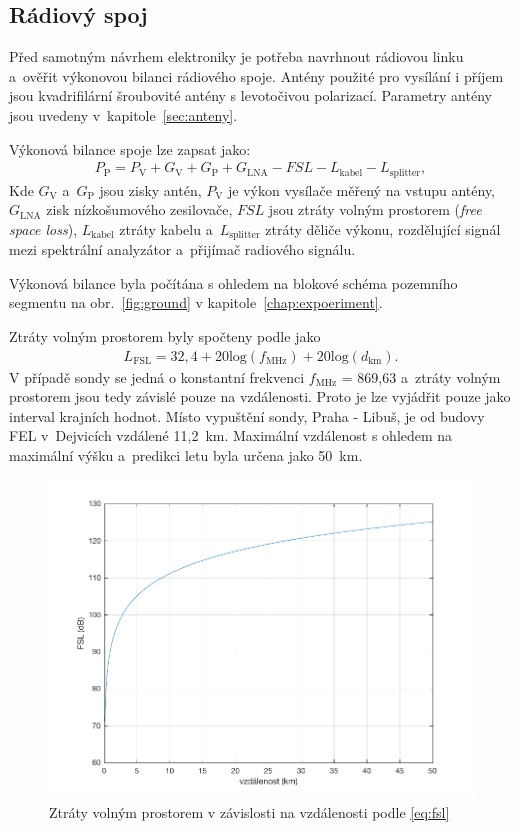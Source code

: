 \documentclass[twoside]{ctuthesis}
\newcommand{\mt}[1]{\text{#1}}
\theoremstyle{plain}
\theoremstyle{definition}
\theoremstyle{note}
\begin{document}
		\subsection{Rádiový spoj}
		Před samotným návrhem elektroniky je potřeba navrhnout rádiovou linku a~ověřit výkonovou bilanci rádiového spoje. Antény použité pro vysílání i příjem jsou kvadrifilární šroubovité antény s levotočivou polarizací. Parametry antény jsou uvedeny v~kapitole~\ref{sec:anteny}.

		Výkonová bilance spoje lze zapsat jako:
		\begin{align}
			P_\mt{P} = P_\mt{V} + G_\mt{V} + G_\mt{P} + G_\mt{LNA} - FSL - L_\mt{kabel} - L_\mt{splitter},
			\label{eq:bilance}
		\end{align}
		Kde $G_\mt{V}$ a~$G_\mt{P}$ jsou zisky antén, $P_\mt{V}$ je výkon vysílače měřený na vstupu antény, $G_\mt{LNA}$ zisk nízkošumového zesilovače, $FSL$ jsou ztráty volným prostorem (\textit{free space loss}), $L_\mt{kabel}$ ztráty kabelu a~$L_\mt{splitter}$ ztráty děliče výkonu, rozdělující signál mezi spektrální analyzátor a~přijímač radiového signálu.

		Výkonová bilance byla počítána s ohledem na blokové schéma pozemního segmentu na obr.~\ref{fig:ground} v kapitole~\ref{chap:expoeriment}.

		Ztráty volným prostorem byly spočteny podle \cite{zaklady:sireni:vln} jako
		\begin{align}
			L_\mt{FSL} = 32,4 + 20\mt{log}(f_\mt{MHz}) + 20\mt{log}(d_\mt{km}).
			\label{eq:fsl}
		\end{align}
		V případě sondy se jedná o konstantní frekvenci $f_\mt{MHz}$ = 869{,}63 a~ztráty volným prostorem jsou tedy závislé pouze na vzdálenosti. Proto je lze vyjádřit pouze jako interval krajních hodnot. Místo vypuštění sondy, Praha - Libuš, je od budovy FEL v~Dejvicích vzdálené 11,2~km. Maximální vzdálenost s ohledem na maximální výšku a~predikci letu byla určena jako 50~km.
		\begin{figure}
			\centering
			\includegraphics[width = .6\textwidth]{Graphs/FSL.pdf}
			\caption{Ztráty volným prostorem v závislosti na vzdálenosti podle \eqref{eq:fsl}}
		\end{figure}
\end{document}
